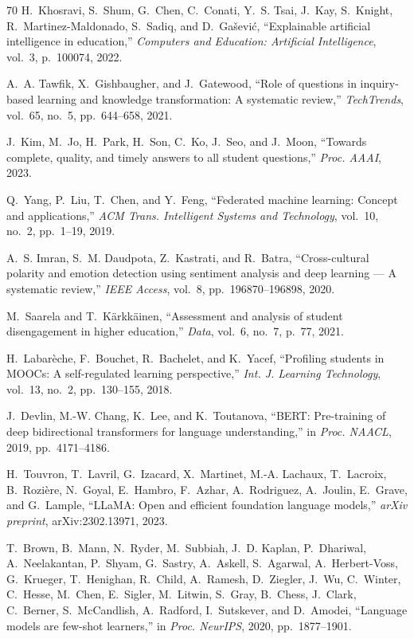 \begin{thebibliography}{70}
H.~Khosravi, S.~Shum, G.~Chen, C.~Conati, Y.~S. Tsai, J.~Kay, S.~Knight, R.~Martinez-Maldonado, S.~Sadiq, and D.~Ga{\v{s}}evi{\'c},
``Explainable artificial intelligence in education,''
\textit{Computers and Education: Artificial Intelligence}, vol.~3, p.~100074, 2022.

A.~A. Tawfik, X.~Gishbaugher, and J.~Gatewood,
``Role of questions in inquiry-based learning and knowledge transformation: A systematic review,''
\textit{TechTrends}, vol.~65, no.~5, pp.~644--658, 2021.

J.~Kim, M.~Jo, H.~Park, H.~Son, C.~Ko, J.~Seo, and J.~Moon,
``Towards complete, quality, and timely answers to all student questions,''
\textit{Proc. AAAI}, 2023.

Q.~Yang, P.~Liu, T.~Chen, and Y.~Feng,
``Federated machine learning: Concept and applications,''
\textit{ACM Trans. Intelligent Systems and Technology}, vol.~10, no.~2, pp.~1--19, 2019.

A.~S. Imran, S.~M. Daudpota, Z.~Kastrati, and R.~Batra,
``Cross-cultural polarity and emotion detection using sentiment analysis and deep learning — A systematic review,''
\textit{IEEE Access}, vol.~8, pp.~196870--196898, 2020.

M.~Saarela and T.~Kärkkäinen,
``Assessment and analysis of student disengagement in higher education,''
\textit{Data}, vol.~6, no.~7, p.~77, 2021.

H.~Labar{\`{e}}che, F.~Bouchet, R.~Bachelet, and K.~Yacef,
``Profiling students in MOOCs: A self-regulated learning perspective,''
\textit{Int. J. Learning Technology}, vol.~13, no.~2, pp.~130--155, 2018.

J.~Devlin, M.-W. Chang, K.~Lee, and K.~Toutanova,
``BERT: Pre-training of deep bidirectional transformers for language understanding,''
in \textit{Proc. NAACL}, 2019, pp.~4171--4186.

H.~Touvron, T.~Lavril, G.~Izacard, X.~Martinet, M.-A. Lachaux, T.~Lacroix, B.~Rozi\`{e}re, N.~Goyal, E.~Hambro, F.~Azhar, A.~Rodriguez, A.~Joulin, E.~Grave, and G.~Lample,
``LLaMA: Open and efficient foundation language models,''
\textit{arXiv preprint}, arXiv:2302.13971, 2023.

T.~Brown, B.~Mann, N.~Ryder, M.~Subbiah, J.~D. Kaplan, P.~Dhariwal, A.~Neelakantan, P.~Shyam, G.~Sastry, A.~Askell, S.~Agarwal, A.~Herbert-Voss, G.~Krueger, T.~Henighan, R.~Child, A.~Ramesh, D.~Ziegler, J.~Wu, C.~Winter, C.~Hesse, M.~Chen, E.~Sigler, M.~Litwin, S.~Gray, B.~Chess, J.~Clark, C.~Berner, S.~McCandlish, A.~Radford, I.~Sutskever, and D.~Amodei,
``Language models are few-shot learners,''
in \textit{Proc. NeurIPS}, 2020, pp.~1877--1901.


\end{thebibliography}
